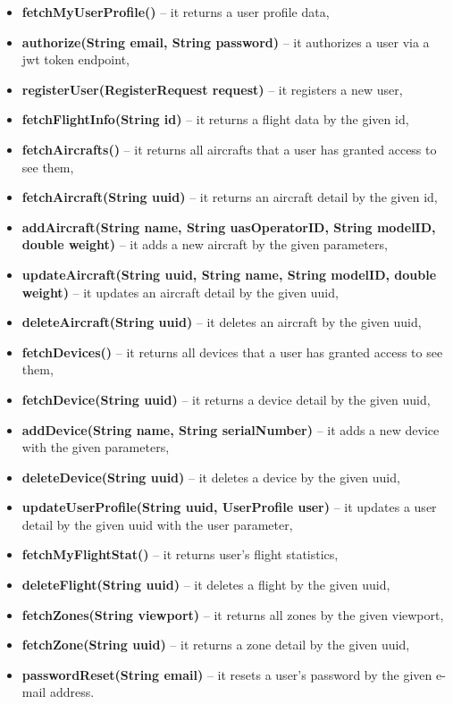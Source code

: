 \begin{itemize}
    \item \textbf{fetchMyUserProfile()} -- it returns a user profile data,
    \item \textbf{authorize(String email, String password)} -- it authorizes a user via a \acrshort{jwt} token endpoint,
    \item \textbf{registerUser(RegisterRequest request)} -- it registers a new user,
    \item \textbf{fetchFlightInfo(String id)} -- it returns a flight data by the given id,
    \item \textbf{fetchAircrafts()} -- it returns all aircrafts that a user has granted access to see them,
    \item \textbf{fetchAircraft(String uuid)} -- it returns an aircraft detail by the given id,
    \item \textbf{addAircraft(String name, String uasOperatorID, String modelID, double weight)} -- it adds a new aircraft by the given parameters,
    \item \textbf{updateAircraft(String uuid, String name, String modelID, double weight)} -- it updates an aircraft detail by the given uuid,
    \item \textbf{deleteAircraft(String uuid)} -- it deletes an aircraft by the given uuid,
    \item \textbf{fetchDevices()} -- it returns all devices that a user has granted access to see them,
    \item \textbf{fetchDevice(String uuid)} -- it returns a device detail by the given uuid,
    \item \textbf{addDevice(String name, String serialNumber)} -- it adds a new device with the given parameters,
    \item \textbf{deleteDevice(String uuid)} -- it deletes a device by the given uuid,
    \item \textbf{updateUserProfile(String uuid, UserProfile user)} -- it updates a user detail by the given uuid with the user parameter,
    \item \textbf{fetchMyFlightStat()} -- it returns user's flight statistics,
    \item \textbf{deleteFlight(String uuid)} -- it deletes a flight by the given uuid,
    \item \textbf{fetchZones(String viewport)} -- it returns all zones by the given viewport,
    \item \textbf{fetchZone(String uuid)} -- it returns a zone detail by the given uuid,
    \item \textbf{passwordReset(String email)} -- it resets a user's password by the given e-mail address.
\end{itemize}

